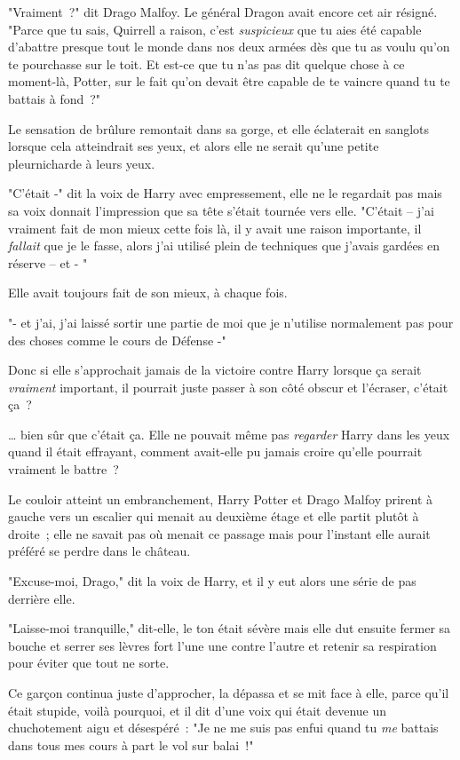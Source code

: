 "Vraiment~?" dit Drago Malfoy. Le général Dragon avait encore cet air résigné. "Parce que tu sais, Quirrell a raison, c'est \emph{suspicieux} que tu aies été capable d'abattre presque tout le monde dans nos deux armées dès que tu as voulu qu'on te pourchasse sur le toit. Et est-ce que tu n'as pas dit quelque chose à ce moment-là, Potter, sur le fait qu'on devait être capable de te vaincre quand tu te battais à fond~?"

Le sensation de brûlure remontait dans sa gorge, et elle éclaterait en sanglots lorsque cela atteindrait ses yeux, et alors elle ne serait qu'une petite pleurnicharde à leurs yeux.

"C'était -" dit la voix de Harry avec empressement, elle ne le regardait pas mais sa voix donnait l'impression que sa tête s'était tournée vers elle. "C'était -- j'ai vraiment fait de mon mieux cette fois là, il y avait une raison importante, il \emph{fallait} que je le fasse, alors j'ai utilisé plein de techniques que j'avais gardées en réserve -- et - "

Elle avait toujours fait de son mieux, à chaque fois.

"- et j'ai, j'ai laissé sortir une partie de moi que je n'utilise normalement pas pour des choses comme le cours de Défense -"

Donc si elle s'approchait jamais de la victoire contre Harry lorsque ça serait \emph{vraiment} important, il pourrait juste passer à son côté obscur et l'écraser, c'était ça~?

… bien sûr que c'était ça. Elle ne pouvait même pas \emph{regarder} Harry dans les yeux quand il était effrayant, comment avait-elle pu jamais croire qu'elle pourrait vraiment le battre~?

Le couloir atteint un embranchement, Harry Potter et Drago Malfoy prirent à gauche vers un escalier qui menait au deuxième étage et elle partit plutôt à droite~; elle ne savait pas où menait ce passage mais pour l'instant elle aurait préféré se perdre dans le château.

"Excuse-moi, Drago," dit la voix de Harry, et il y eut alors une série de pas derrière elle.

"Laisse-moi tranquille," dit-elle, le ton était sévère mais elle dut ensuite fermer sa bouche et serrer ses lèvres fort l'une une contre l'autre et retenir sa respiration pour éviter que tout ne sorte.

Ce garçon continua juste d'approcher, la dépassa et se mit face à elle, parce qu'il était stupide, voilà pourquoi, et il dit d'une voix qui était devenue un chuchotement aigu et désespéré~: "Je ne me suis pas enfui quand tu \emph{me} battais dans tous mes cours à part le vol sur balai~!"

